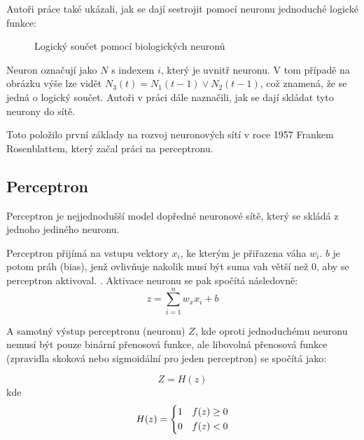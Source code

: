 \documentclass[FM,BP,fonts]{tulthesis}
\begin{document}
Autoři práce také ukázali, jak se dají sestrojit pomocí neuronu jednoduché logické funkce: 

\begin{figure}[htbp]
	\centering
	\caption{Logický součet pomocí biologických neuronů}
	\label{fig:logic_or}
\end{figure}

Neuron označují jako $N$ s indexem $i$, který je uvnitř neuronu. V tom případě na obrázku výše lze vidět $N_3(t) = N_1(t-1) \vee N_2(t-1)$, což znamená, že se jedná o logický součet. \cite{mcculloch1943logical} Autoři v práci dále naznačili, jak se dají skládat tyto neurony do sítě. 

Toto položilo první základy na rozvoj neuronových sítí v roce 1957 Frankem Rosenblattem, který začal práci na perceptronu.
\newpage
\subsection{Perceptron}
Perceptron je nejjednodušší model dopředné neuronové sítě, který se skládá z jednoho jediného neuronu.

Perceptron přijímá na vstupu vektory $x_i$, ke kterým je přiřazena váha $w_i$. $b$ je potom práh (bias), jenž ovlivňuje nakolik musí být suma vah větší než 0, aby se perceptron aktivoval. \cite{martinpilatNN}. Aktivace neuronu se pak spočítá následovně:
\label{eq:activation_percep}
\begin{equation}
	z = \sum_{i=1}^{n} w_xx_i + b
\end{equation}

A samotný výstup perceptronu (neuronu) $Z$, kde oproti jednoduchému neuronu nemusí být pouze binární přenosová funkce, ale libovolná přenosová funkce (zpravidla skoková nebo sigmoidální pro jeden perceptron) \cite{martinpilatNN} se spočítá jako:

\begin{equation}
	Z = H(z)
\end{equation}
kde
\begin{equation}
	H(z) = \begin{dcases}
		1 & f(z) \geq 0 \\
		0 & f(z) < 0
	\end{dcases}
\end{equation}
\end{document}
